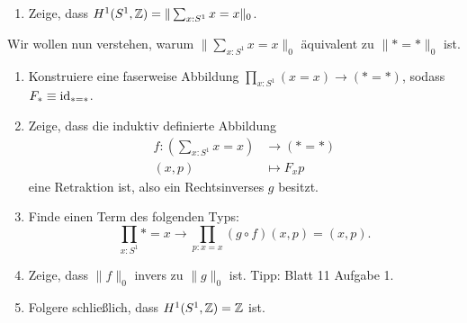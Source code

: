 \documentclass{uebung}
\begin{document}

\begin{exercise}
\end{exercise}

\begin{exercise}
  \begin{enumerate}
    \item Zeige, dass $H^1(S^1,\mathbb{Z}) = \|\sum_{x:S^1} x=x\|_0$.
  \end{enumerate}
  Wir wollen nun verstehen, warum $\|\sum_{x:S^1} x=x\|_0$ äquivalent zu $\|\ast = \ast\|_0$ ist.
  \begin{enumerate}[start=2]
    \item Konstruiere eine faserweise Abbildung $\prod_{x:S^1} (x = x) \to (\ast = \ast)$, sodass $F_\ast\equiv\mathrm{id}_{\ast = \ast}$.
    \item Zeige, dass die induktiv definierte Abbildung
      \begin{align*}
        f:\left(\sum_{x:S^1} x=x\right) &\to (\ast=\ast)\\
        (x,p)&\mapsto F_xp
      \end{align*}
      eine Retraktion ist, also ein Rechtsinverses $g$ besitzt.
    \item Finde einen Term des folgenden Typs:
      $$
      \prod_{x:S^1} \ast=x \to \prod_{p:x=x} (g\circ f)(x,p) = (x,p).
      $$
    \item Zeige, dass $\|f\|_0$ invers zu $\|g\|_0$ ist. {\tiny Tipp: Blatt 11 Aufgabe 1.}
    \item Folgere schließlich, dass $H^1(S^1,\mathbb{Z}) = \mathbb{Z}$ ist.
  \end{enumerate}
\end{exercise}

\begin{exercise}
\end{exercise}
\end{document}
